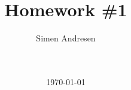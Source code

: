 \newcommand{\figurepath}{./figures/}
\newcommand{\figurescale}{0.5}
\newcommand{\codepath}{../matlab/}




\title{Homework \#1 }
\author{Simen Andresen}
\date{\ \\ \ \\ \today}




\maketitle


\pagestyle{fancy}
\lhead{}
\rhead{\thepage}
\setcounter{page}{1}

\rhead{\thepage}
\cfoot{}


%



